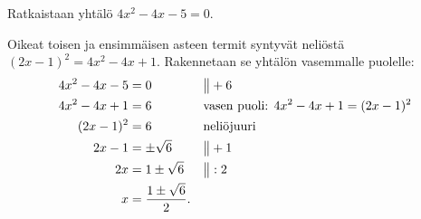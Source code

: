 \begin{esimerkki}
Ratkaistaan yhtälö $4x^2-4x-5=0$. 

Oikeat toisen ja ensimmäisen asteen termit syntyvät
neliöstä $(2x-1)^2=4x^2-4x+1$. Rakennetaan se yhtälön vasemmalle
puolelle:
\begin{align*}
4x^2-4x-5 &= 0 &&\big\| + 6  \\
4x^2-4x+1 &= 6 &&\text{vasen puoli: $  4x^2-4x+1 = (2x-1)^2$} \\
(2x-1)^2 &= 6 &&\text{neliöjuuri} \\
2x-1 &= \pm \sqrt{6} &&\big\| + 1 \\
2x &= 1 \pm \sqrt{6} &&\big\| : 2 \\
x &= \frac{1\pm \sqrt{6}}{2}.
\end{align*}
\end{esimerkki}

%
%
%

